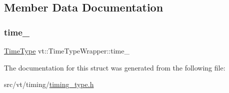 \subsection{Member Data Documentation}
\mbox{\label{structvt_1_1_time_type_wrapper_a9fb04e50743e0d2b5f5727d1378bcda4}} 
\subsubsection{\texorpdfstring{time\+\_\+}{time\_}}
{\footnotesize\ttfamily \hyperlink{namespacevt_a876a9d0cd5a952859c72de8a46881442}{Time\+Type} vt\+::\+Time\+Type\+Wrapper\+::time\+\_\+\hspace{0.3cm}{\ttfamily [private]}}



The documentation for this struct was generated from the following file\+:\begin{DoxyCompactItemize}
\item 
src/vt/timing/\hyperlink{timing__type_8h}{timing\+\_\+type.\+h}\end{DoxyCompactItemize}
